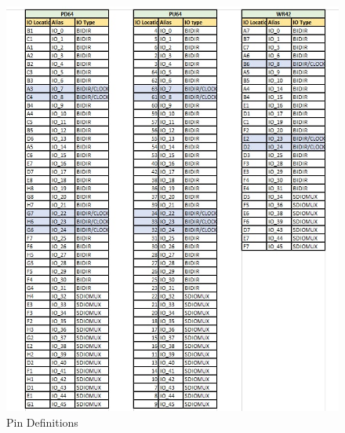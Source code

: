 \begin{enumerate}[label=\arabic*.,ref=\theenumi]
\begin{figure}[!ht]
\includegraphics[width = \textwidth]{vaman/fpga/sevenseg/figs/pins.jpg}
\caption{Pin Definitions}
\label{fig:vaman/fpga/sevenseg/pins}
\end{figure}

\end{enumerate}

